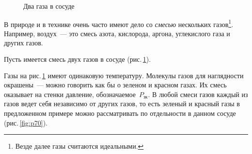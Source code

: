 \documentclass[main.tex]{subfiles}
\begin{document}
{%
\setlength\intextsep{0pt}
\begin{figure}
    \centering
    \caption{Два газа в сосуде}
    \label{fig:p69}
\end{figure}

В природе и в технике очень часто имеют дело со \emph{смесью} нескольких газов\footnote{Везде далее газы считаются идеальными.}. Например, воздух~--- это смесь азота, кислорода, аргона, углекислого газа и других газов.


Пусть имеется смесь двух газов в сосуде (рис.\,\ref{fig:p69}).









Газы на рис.\,\ref{fig:p69} имеют одинаковую температуру. Молекулы газов для наглядности окрашены~--- можно говорить как бы о зеленом и красном газах. Их смесь оказывает на стенки давление, обозначаемое~$P_\text{зк}$. В любой смеси газов каждый из газов ведет себя независимо от других газов, то есть зеленый и красный газы в предложенном примере можно рассматривать по отдельности в данном сосуде (рис.\,\ref{fig:p70}).  

}
\end{document}

